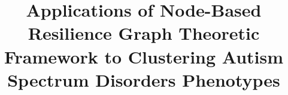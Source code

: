 \documentclass{bmcart}
\begin{document}
\begin{frontmatter}

\begin{fmbox}


\title{Applications of Node-Based Resilience Graph Theoretic Framework to Clustering
Autism Spectrum Disorders Phenotypes}


\author[
   addressref={aff1},                   %
   email={jmatta@siue.edu}   %
]{ }
\author[
   addressref={aff2},
   email={Junya009@live.missouristate.edu}
]{ }
\author[
   addressref={aff1},
   email={gercal@siue.edu}
]{ }
\author[
   addressref={aff3},
      corref={aff3},                      %
   email={tayoobafemiajayi@missouristate.edu}
]{ }


\address[id=aff1]{%
  , %
  ,                              %
}
\address[id=aff2]{%
  ,
  ,
}
\address[id=aff3]{%
  ,
   ,
}


\end{fmbox}
\end{frontmatter}
\end{document}
